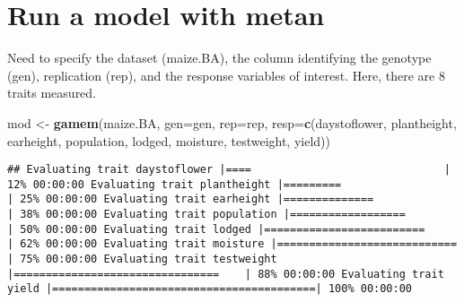 \documentclass[
]{article}
\newenvironment{Shaded}{\begin{snugshade}}{\end{snugshade}}
\newcommand{\AttributeTok}[1]{\textcolor[rgb]{0.13,0.29,0.53}{#1}}
\newcommand{\CommentTok}[1]{\textcolor[rgb]{0.56,0.35,0.01}{\textit{#1}}}
\newcommand{\FunctionTok}[1]{\textcolor[rgb]{0.13,0.29,0.53}{\textbf{#1}}}
\newcommand{\NormalTok}[1]{#1}
\newcommand{\OtherTok}[1]{\textcolor[rgb]{0.56,0.35,0.01}{#1}}
\newcommand{\SpecialCharTok}[1]{\textcolor[rgb]{0.81,0.36,0.00}{\textbf{#1}}}
\newcommand{\StringTok}[1]{\textcolor[rgb]{0.31,0.60,0.02}{#1}}
\begin{document}
\begin{Shaded}
\end{Shaded}

\section{Run a model with metan}\label{run-a-model-with-metan}

Need to specify the dataset (maize.BA), the column identifying the
genotype (gen), replication (rep), and the response variables of
interest. Here, there are 8 traits measured.

\begin{Shaded}
\begin{Highlighting}[]
\NormalTok{mod }\OtherTok{\textless{}{-}}
  \FunctionTok{gamem}\NormalTok{(maize.BA, }
        \AttributeTok{gen=}\NormalTok{gen, }
        \AttributeTok{rep=}\NormalTok{rep, }
        \AttributeTok{resp=}\FunctionTok{c}\NormalTok{(daystoflower, plantheight, earheight, population, lodged, moisture, testweight, yield))}
\end{Highlighting}
\end{Shaded}

\begin{verbatim}
## Evaluating trait daystoflower |====                              | 12% 00:00:00 Evaluating trait plantheight |=========                          | 25% 00:00:00 Evaluating trait earheight |==============                       | 38% 00:00:00 Evaluating trait population |==================                  | 50% 00:00:00 Evaluating trait lodged |=========================               | 62% 00:00:00 Evaluating trait moisture |============================          | 75% 00:00:00 Evaluating trait testweight |================================    | 88% 00:00:00 Evaluating trait yield |=========================================| 100% 00:00:00 
\end{verbatim}
\end{document}
